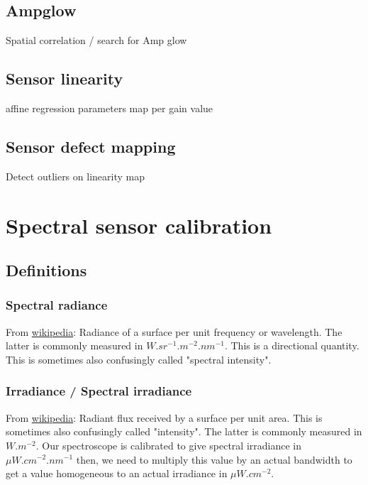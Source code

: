 \documentclass{article}
\begin{document}
  \subsection{Ampglow}
    Spatial correlation / search for Amp glow

  \subsection{Sensor linearity}
    affine regression parameters map per gain value

  \subsection{Sensor defect mapping}
    Detect outliers on linearity map


\section{Spectral sensor calibration}
  \subsection{Definitions}
    \subsubsection{Spectral radiance}
      From \href{https://en.wikipedia.org/wiki/Radiance#Spectral_radiance}{wikipedia}:
      Radiance of a surface per unit frequency or wavelength. The latter is commonly measured in $W.sr^{-1}.m^{-2}.nm^{-1}$. This is a directional quantity. This is sometimes also confusingly called "spectral intensity".

    \subsubsection{Irradiance / Spectral irradiance}
      From \href{https://en.wikipedia.org/wiki/Irradiance}{wikipedia}:
      Radiant flux received by a surface per unit area. This is sometimes also confusingly called "intensity". The latter is commonly measured in $W.m^{-2}$.
      Our spectroscope is calibrated to give spectral irradiance in $\mu W . cm^{-2} . nm^{-1}$ then, we need to multiply this value by an actual bandwidth to get a value homogeneous to an actual irradiance in $\mu W . cm^{-2}$.
\end{document}
